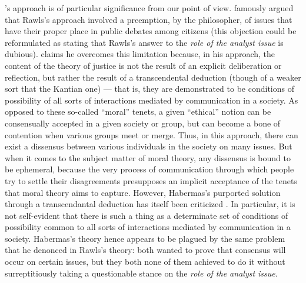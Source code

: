 \documentclass[version=3.21, pagesize, twoside=off, bibliography=totoc, DIV=calc, fontsize=12pt, a4paper, french, english]{scrartcl}
\begin{document}
\citeauthor{habermas_moralbewustsein_1983}'s
\citeyearpar{habermas_moralbewustsein_1983} approach is of particular significance from our point of view. \citet{habermas_short_1999} famously argued that Rawls's approach involved a preemption, by the philosopher, of issues that have their proper place in public debates among citizens (this objection could be reformulated as stating that Rawls's answer to the \emph{role of the analyst issue} is dubious).
\citet{habermas_moralbewustsein_1983} claims he overcomes this limitation because, in his approach, the content of the theory of justice is not the result of an explicit deliberation or reflection, but rather the result of a transcendental deduction (though of a weaker sort that the Kantian one) --- that is, they are demonstrated to be conditions of possibility of all sorts of interactions mediated by communication in a society. As opposed to these so-called “moral” tenets, a given “ethical” notion can be consensually accepted in a given society or group, but can become a bone of contention when various groups meet or merge. 
Thus, in this approach, there can exist a dissensus between various individuals in the society on many issues. 
But when it comes to the subject matter of moral theory, any dissensus is bound to be ephemeral, because the very process of communication through which people try to settle their disagreements presupposes an implicit acceptance of the tenets that moral theory aims to capture. However, Habermas's purported solution through a transcendantal deduction has itself been criticized \citep{heath_communicative_2001}. 
In particular, it is not self-evident that there is such a thing as a determinate set of conditions of possibility common to all sorts of interactions mediated by communication in a society. 
Habermas's theory hence appears to be plagued by the same problem that he denonced in Rawls's theory: both wanted to prove that consensus will occur on certain issues, but they both none of them achieved to do it without surreptitiously taking a questionable stance on the \emph{role of the analyst issue}. %
\end{document}
